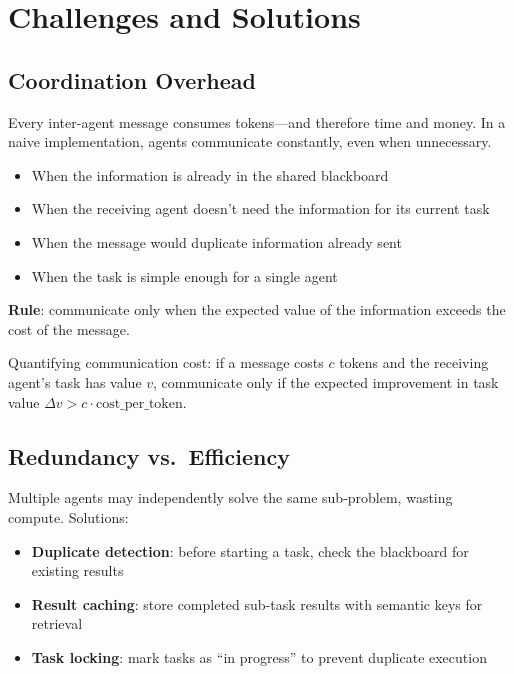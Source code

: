 \section{Challenges and Solutions}
\label{subsec:mas-challenges}

\subsection{Coordination Overhead}
\label{coordination-overhead}

Every inter-agent message consumes tokens---and therefore time and money. In a naive implementation, agents communicate constantly, even when unnecessary.

\begin{keybox}
\begin{itemize}
  \item When the information is already in the shared blackboard
  \item When the receiving agent doesn’t need the information for its current task
  \item When the message would duplicate information already sent
  \item When the task is simple enough for a single agent
\end{itemize}

\textbf{Rule}: communicate only when the expected value of the information exceeds the cost of the message.
\end{keybox}

Quantifying communication cost: if a message costs $c$ tokens and the receiving agent’s task has value $v$, communicate only if the expected improvement in task value $\Delta v > c \cdot \text{cost\_per\_token}$.

\subsection{Redundancy vs.~Efficiency}
\label{redundancy-vs.-efficiency}

Multiple agents may independently solve the same sub-problem, wasting compute. Solutions:

\begin{itemize}
  \item \textbf{Duplicate detection}: before starting a task, check the blackboard for existing results
  \item \textbf{Result caching}: store completed sub-task results with semantic keys for retrieval
  \item \textbf{Task locking}: mark tasks as ``in progress'' to prevent duplicate execution
\end{itemize}

